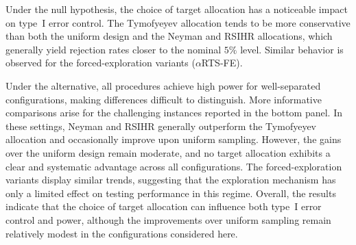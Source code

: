 %

Under the null hypothesis, the choice of target allocation has a noticeable
	impact on type~I error control. The Tymofyeyev allocation tends to be more
	conservative than both the uniform design and the Neyman and RSIHR
	allocations, which generally yield rejection rates closer to the nominal
	\(5\%\) level. Similar behavior is observed for the
	forced-exploration variants (\(\alpha\)RTS-FE).
	
	Under the alternative, all procedures achieve high power for well-separated configurations, making differences difficult to distinguish. More informative comparisons arise for the challenging instances reported in the
	bottom panel. In these settings, Neyman and RSIHR generally outperform the Tymofyeyev allocation and occasionally improve upon uniform sampling.
	However, the gains over the uniform design remain moderate, and no target allocation exhibits a clear and systematic advantage across all configurations. The forced-exploration variants display similar trends, suggesting that the exploration mechanism has only a limited effect on testing performance in
	this regime. Overall, the results indicate that the choice of target allocation can influence both type~I error control and power, although the
	improvements over uniform sampling remain relatively modest in the configurations considered here.

